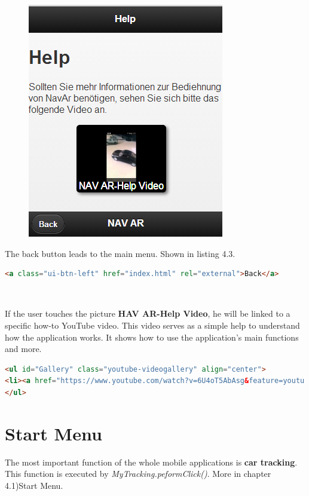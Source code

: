 \begin{figure}[h]
\centering
\includegraphics[width=0.5\linewidth]{graphics/chapter4/2}
\caption{}
\label{fig:2}
\end{figure}
\newpage

The back button leads to the main menu. Shown in listing 4.3.
\\
\begin{lstlisting}[language=html, caption= 
Back button,captionpos=b]
<a class="ui-btn-left" href="index.html" rel="external">Back</a>
\end{lstlisting}
\
\


If the user touches the picture \textbf{HAV AR-Help Video}, he will be linked to a specific how-to YouTube video. This video serves as a simple help to understand how the application works. It shows how to use the application's main functions and more.
\\
\begin{lstlisting}[language=html, caption= 
Help video,captionpos=b]
<ul id="Gallery" class="youtube-videogallery" align="center">
<li><a href="https://www.youtube.com/watch?v=6U4oT5AbAsg&feature=youtu.be">NAV AR-Help Video</a></li>
</ul>
\end{lstlisting}

\section{Start Menu}
The most important function of the whole mobile applications is \textbf{car tracking}. This function is executed by \textit{MyTracking.peformClick()}. More in chapter 4.1)Start Menu.
\\

